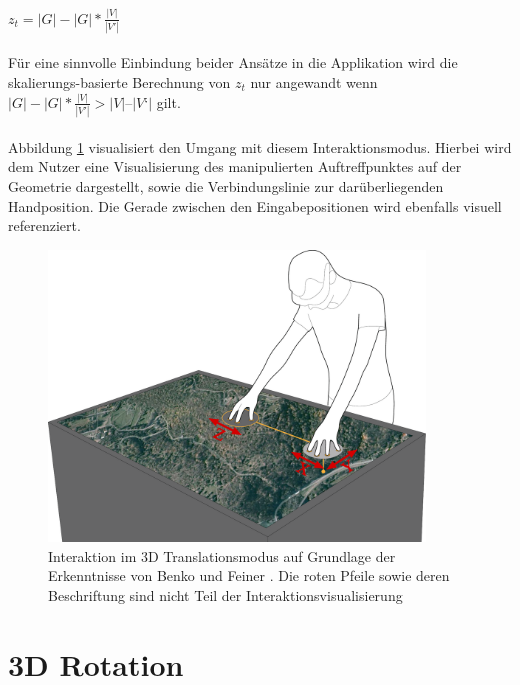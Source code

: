 \\\\
$z_t = |G| - |G| * \frac{|V|}{|V'|}$
\\\\
Für eine sinnvolle Einbindung beider Ansätze in die Applikation wird die skalierungs-basierte Berechnung von $z_t$ nur angewandt wenn \linebreak $|G| - |G| * \frac{|V|}{|V'|} > |V| – |V‘|$ gilt. 
\\\\
Abbildung \ref{fig:baloon_interaction} visualisiert den Umgang mit diesem Interaktionsmodus. Hierbei wird dem Nutzer eine Visualisierung des manipulierten Auftreffpunktes auf der Geometrie dargestellt, sowie die Verbindungslinie zur darüberliegenden Handposition. Die Gerade zwischen den Eingabepositionen wird ebenfalls visuell referenziert.

\begin{figure}
	\begin{center}
		\includegraphics[width=10cm]{img/baloon_interaction.pdf}
	\end{center}
	\caption{Interaktion im 3D Translationsmodus auf Grundlage der Erkenntnisse von Benko und Feiner \cite{benko:2007}. Die roten Pfeile sowie deren Beschriftung sind nicht Teil der Interaktionsvisualisierung}
	\label{fig:baloon_interaction}
\end{figure}

\section{3D Rotation}
\label{sec:3d_rotation}

